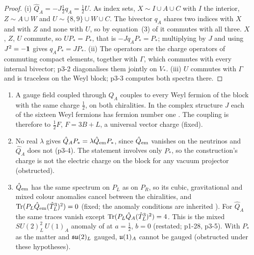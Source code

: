 \begin{proof}
(i) $\hat Q_A=-J\tfrac12q_A=\tfrac12U$. As index sets, $X\sim I\cup A\cup C$ with $I$ the interior, $Z\sim A\cup W$ and $U\sim\{8,9\}\cup W\cup C$. The bivector $q_A$ shares two
indices with $X$ and with $Z$ and none with $U$, so by equation~(3) of \cite{ES17} it commutes with all three. $X$, $Z$, $U$ commute, so $UP_*=P_*$, that is
$-Jq_AP_*=P_*$; multiplying by $J$ and using $J^2=-\mathbf 1$ gives $q_AP_*=JP_*$. (ii) The operators are the charge operators of commuting compact elements, together with
$\Gamma$, which commutes with every internal bivector; p3-2 diagonalises them jointly on $V_*$. (iii) $U$ commutes with $\Gamma$ and is traceless on the Weyl block;
p3-3 computes both spectra there.
\end{proof}

\begin{corollary}
\label{p3:cor:notem}
\begin{enumerate}[label=(\roman*),leftmargin=2.2em]
\item A gauge field coupled through $Q_A$ couples to every Weyl fermion of the block with the same charge $\tfrac12$, on both chiralities. In the complex structure
$J$ each of the sixteen Weyl fermions has fermion number one \cite[Section~8]{ES17}. The coupling is therefore to $\tfrac12F$, $F=3B+L$, a universal vector charge
(fixed).
\item No real $\lambda$ gives $\hat Q_AP_*=\lambda\hat Q_{\rm em}P_*$, since $\hat Q_{\rm em}$ vanishes on the neutrinos and $\hat Q_A$ does not (p3-4). The statement
involves only $P_*$, so the construction's charge is not the electric charge on the block for any vacuum projector (obstructed).
\item $\hat Q_{\rm em}$ has the same spectrum on $P_L$ as on $P_R$, so its cubic, gravitational and mixed colour anomalies cancel between the chiralities, and
$\operatorname{Tr}(P_L\hat Q_{\rm em}(\hat T^3_L)^2)=0$ (fixed; the anomaly conditions are inherited \cite{BouchiatIliopoulosMeyer72,GeorgiGlashow72}). For $\hat Q_A$ the same
traces vanish except $\operatorname{Tr}(P_L\hat Q_A(\hat T^3_L)^2)=4$. This is the mixed $SU(2)_L^2\,U(1)_A$ anomaly of \cite[Prop.~8.5]{ES17} at $a=\tfrac12$, $b=0$ (restated;
p1-28, p3-5). With $P_*$ as the matter and $\mathfrak{su}(2)_L$ gauged, $\mathfrak{u}(1)_A$ cannot be gauged (obstructed under these hypotheses).
\end{enumerate}
\end{corollary}


